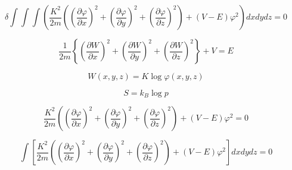 $$
\delta \int\int\int\left(\frac{K^2}{2m}\left(\left(\frac{\partial \varphi}{\partial x}\right)^2+\left(\frac{\partial \varphi}{\partial y}\right)^2+\left(\frac{\partial \varphi}{\partial z}\right)^2\right)+(V-E)\varphi^2\right)dxdydz=0
$$

$$
\frac{1}{2m}\left\{\left(\frac{\partial W}{\partial x}\right)^2+\left(\frac{\partial W}{\partial y}\right)^2+\left(\frac{\partial W}{\partial z}\right)^2\right\}+V=E
$$

$$
W(x,y,z)=K\log\varphi(x,y,z)
$$

$$
S=k_B\log p
$$

$$
\frac{K^2}{2m}\left(\left(\frac{\partial \varphi}{\partial x}\right)^2+\left(\frac{\partial \varphi}{\partial y}\right)^2+\left(\frac{\partial \varphi}{\partial z}\right)^2\right)+(V-E)\varphi^2=0
$$

$$
\int\left[\frac{K^2}{2m}\left(\left(\frac{\partial \varphi}{\partial x}\right)^2+\left(\frac{\partial \varphi}{\partial y}\right)^2+\left(\frac{\partial \varphi}{\partial z}\right)^2\right)+(V-E)\varphi^2 \right]dxdydz=0
$$
